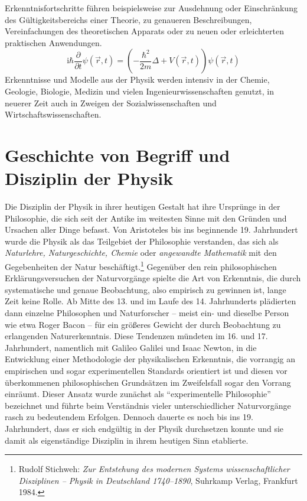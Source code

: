 \documentclass[titlepage, parkskip=full, twocolumn, landscape]{scrartcl}
\begin{document}
Erkenntnisfortschritte führen beispielsweise zur Ausdehnung oder Einschränkung des Gültigkeitsbereichs einer Theorie, zu genaueren Beschreibungen, Vereinfachungen des theoretischen Apparats oder zu neuen oder erleichterten praktischen Anwendungen.
\begin{equation}
	\mathrm{i}\hbar\frac{\partial}{\partial t} \psi(\vec{r},t) = \left(-\frac{\hbar^2}{2m}\Delta + V(\vec{r},t)\right) \psi(\vec{r},t) \label{eq:schrödinger}
\end{equation}
Erkenntnisse und Modelle aus der Physik werden intensiv in der Chemie, Geologie, Biologie, Medizin und vielen Ingenieurwissenschaften genutzt, in neuerer Zeit auch in Zweigen der Sozialwissenschaften und Wirtschaftswissenschaften.

\section{Geschichte von Begriff und Disziplin der Physik}
Die Disziplin der Physik in ihrer heutigen Gestalt hat ihre Ursprünge in der Philosophie, die sich seit der Antike im weitesten Sinne mit den Gründen und Ursachen aller Dinge befasst. Von Aristoteles bis ins beginnende 19. Jahrhundert wurde die Physik als das Teilgebiet der Philosophie verstanden, das sich als \emph{Naturlehre, Naturgeschichte, Chemie} oder \emph{angewandte Mathematik} mit den Gegebenheiten der Natur beschäftigt.\footnote{Rudolf Stichweh: \emph{Zur Entstehung des modernen Systems wissenschaftlicher Disziplinen -- Physik in Deutschland 1740--1890}, Suhrkamp Verlag, Frankfurt 1984.} Gegenüber den rein philosophischen Erklärungsversuchen der Naturvorgänge spielte die Art von Erkenntnis, die durch systematische und genaue Beobachtung, also empirisch zu gewinnen ist, lange Zeit keine Rolle. Ab Mitte des 13. und im Laufe des 14. Jahrhunderts plädierten dann einzelne Philosophen und Naturforscher -- meist ein- und dieselbe Person wie etwa Roger Bacon -- für ein größeres Gewicht der durch Beobachtung zu erlangenden Naturerkenntnis. Diese Tendenzen mündeten im 16. und 17. Jahrhundert, namentlich mit Galileo Galilei und Isaac Newton, in die Entwicklung einer Methodologie der physikalischen Erkenntnis, die vorrangig an empirischen und sogar experimentellen Standards orientiert ist und diesen vor überkommenen philosophischen Grundsätzen im Zweifelsfall sogar den Vorrang einräumt. Dieser Ansatz wurde zunächst als "`experimentelle Philosophie"' bezeichnet und führte beim Verständnis vieler unterschiedlicher Naturvorgänge rasch zu bedeutendem Erfolgen. Dennoch dauerte es noch bis ins 19. Jahrhundert, dass er sich endgültig in der Physik durchsetzen konnte und sie damit als eigenständige Disziplin in ihrem heutigen Sinn etablierte.
\end{document}
